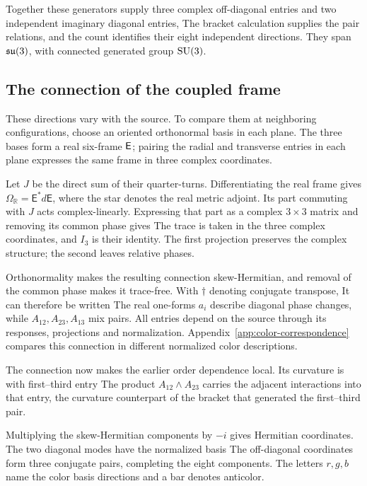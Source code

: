 Together these generators supply three complex off-diagonal entries and two independent imaginary diagonal entries,
\AlgebraDimensionDisplay
The bracket calculation supplies the pair relations, and the count identifies their eight independent directions. They span $\mathfrak{su}(3)$, with connected generated group $\mathrm{SU}(3)$.

\subsection{The connection of the coupled frame}
These directions vary with the source. To compare them at neighboring configurations, choose an oriented orthonormal basis in each plane. The three bases form a real six-frame $\mathsf E$; pairing the radial and transverse entries in each plane expresses the same frame in three complex coordinates.

Let $J$ be the direct sum of their quarter-turns. Differentiating the real frame gives $\Omega_{\mathbb R}=\mathsf E^*d\mathsf E$, where the star denotes the real metric adjoint. Its part commuting with $J$ acts complex-linearly. Expressing that part as a complex $3\times3$ matrix and removing its common phase gives
\AlgebraCompatibleConnectionDisplay
The trace is taken in the three complex coordinates, and $I_3$ is their identity. The first projection preserves the complex structure; the second leaves relative phases.

Orthonormality makes the resulting connection skew-Hermitian, and removal of the common phase makes it trace-free. With $\dagger$ denoting conjugate transpose,
\AlgebraConnectionPropertiesDisplay
It can therefore be written
\AlgebraConnectionMatrixDisplay
The real one-forms $a_i$ describe diagonal phase changes, while $A_{12},A_{23},A_{13}$ mix pairs. All entries depend on the source through its responses, projections and normalization. Appendix~\ref{app:color-correspondence} compares this connection in different normalized color descriptions.

The connection now makes the earlier order dependence local. Its curvature is
\AlgebraGaugeCurvatureDisplay
with first--third entry
\AlgebraCrossCurvatureDisplay
The product $A_{12}\wedge A_{23}$ carries the adjacent interactions into that entry, the curvature counterpart of the bracket that generated the first--third pair.

Multiplying the skew-Hermitian components by $-i$ gives Hermitian coordinates. The two diagonal modes have the normalized basis
\AlgebraDiagonalModesDisplay
The off-diagonal coordinates form three conjugate pairs, completing the eight components. The letters $r,g,b$ name the color basis directions and a bar denotes anticolor.

